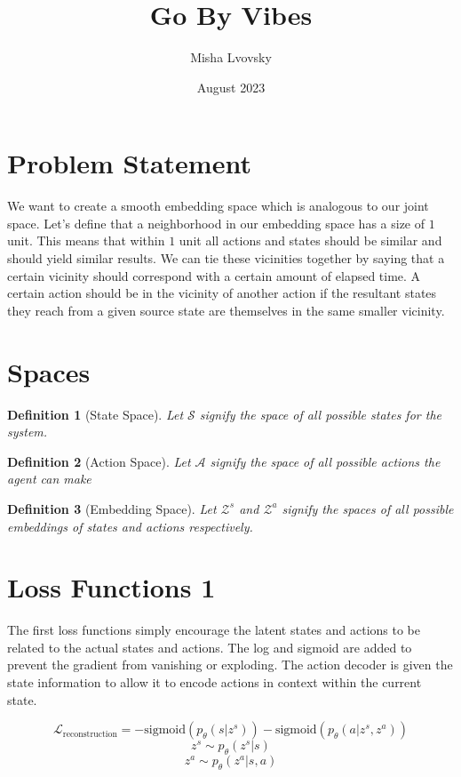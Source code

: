 \documentclass{article}
\title{Go By Vibes}
\author{Misha Lvovsky}
\date{August 2023}
\newtheorem{definition}{Definition}
\begin{document}
\maketitle

\section{Problem Statement}

We want to create a smooth embedding space which is analogous to our joint space.
Let's define that a neighborhood in our embedding space has a size of $1$ unit. This means that within $1$ unit all actions and states should be similar and should yield similar results. We can tie these vicinities together by saying that a certain vicinity should correspond with a certain amount of elapsed time. A certain action should be in the vicinity of another action if the resultant states they reach from a given source state are themselves in the same smaller vicinity.

\section{Spaces}

\begin{definition} [State Space] Let $\mathcal{S}$ signify the space of all possible states for the system.
\end{definition}
\begin{definition} [Action Space]
    Let $\mathcal{A}$ signify the space of all possible actions the agent can make
\end{definition}
\begin{definition} [Embedding Space]
Let $\mathcal{Z}^s$ and $\mathcal{Z}^a$ signify the spaces of all possible embeddings of states and actions respectively.
\end{definition}

\section{Loss Functions 1}

The first loss functions simply encourage the latent states and actions to be related to the actual states and actions.
The log and sigmoid are added to prevent the gradient from vanishing or exploding.
The action decoder is given the state information to allow it to encode actions in context within the current state.

$$\mathcal{L}_\text{reconstruction} = -\text{sigmoid}(p_\theta(s|z^s)) - \text{sigmoid}(p_\theta(a|z^s,z^a))$$
$$z^s \sim p_\theta(z^s | s)$$
$$z^a \sim p_\theta(z^a | s, a)$$
\end{document}
